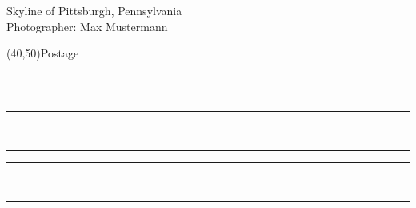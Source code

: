 \documentclass[a6paper,landscape,7pt]{scrartcl}
\begin{document}
\begin{multicols}{2}
    Skyline of Pittsburgh, Pennsylvania\\
    {\small Photographer: Max Mustermann}
    \columnbreak\par
    \vspace*{0cm}
    \hfill\framebox(40,50){\scriptsize Postage}\hspace*{1cm}\par
    \vspace{0.2\textheight}
    \rule{6.0cm}{0.01cm}\vspace*{1cm}\\ %
    \rule{6.0cm}{0.01cm}\vspace*{1cm}\\ %
    \rule{2.2cm}{0.01cm}\hspace*{0.2cm}\rule{3.6cm}{0.01cm}\vspace*{1cm}\\ %
    \rule{6.0cm}{0.01cm}\\ %
\end{multicols}
\end{document}
